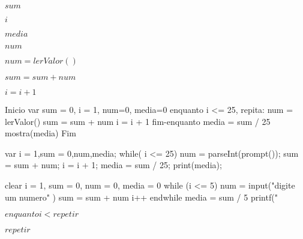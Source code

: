 \documentclass[a4paper,11pt]{article}
\def\lthtmlcheckvsize{\ifdim\ht\sizebox<\vsize 
  \ifdim\wd\sizebox<\hsize\expandafter\hfill\fi \expandafter\vfill
  \else\expandafter\vss\fi}%
\begin{document}
{\newpage\clearpage
{}%
$sum$%
\lthtmlindisplaymathZ
\lthtmlcheckvsize\clearpage}

{\newpage\clearpage
{}%
$i$%
\lthtmlindisplaymathZ
\lthtmlcheckvsize\clearpage}

{\newpage\clearpage
{}%
$media$%
\lthtmlindisplaymathZ
\lthtmlcheckvsize\clearpage}

{\newpage\clearpage
{}%
$num$%
\lthtmlindisplaymathZ
\lthtmlcheckvsize\clearpage}

{\newpage\clearpage
{}%
$num = lerValor()$%
\lthtmlindisplaymathZ
\lthtmlcheckvsize\clearpage}

{\newpage\clearpage
{}%
$sum = sum + num$%
\lthtmlindisplaymathZ
\lthtmlcheckvsize\clearpage}

{\newpage\clearpage
{}%
$i = i + 1$%
\lthtmlindisplaymathZ
\lthtmlcheckvsize\clearpage}

{\newpage\clearpage
{}%
\begin{pseudocode}
Inicio
var sum = 0, i = 1, num=0, media=0
enquanto i <= 25, repita:
	num = lerValor()
	sum = sum + num
	i = i + 1
fim-enquanto
media = sum / 25
mostra(media)
Fim
\end{pseudocode}%
\lthtmlfigureZ
\lthtmlcheckvsize\clearpage}

{\newpage\clearpage
{}%
\begin{code}
var i = 1,sum = 0,num,media;
while( i <= 25){
  num = parseInt(prompt());
  sum = sum + num;
  i = i + 1;
}
media = sum / 25;
print(media);
\end{code}%
\lthtmlfigureZ
\lthtmlcheckvsize\clearpage}

{\newpage\clearpage
{}%
\begin{code}
clear
i = 1, sum = 0, num = 0, media = 0
while (i <= 5)
  num = input("digite um numero" )
  sum = sum + num
  i++
endwhile
media = sum / 5
printf(" %
\end{code}%
\lthtmlfigureZ
\lthtmlcheckvsize\clearpage}

{\newpage\clearpage
{}%
$enquanto i<repetir$%
\lthtmlindisplaymathZ
\lthtmlcheckvsize\clearpage}

{\newpage\clearpage
{}%
$repetir$%
\lthtmlindisplaymathZ
\lthtmlcheckvsize\clearpage}
\end{document}

